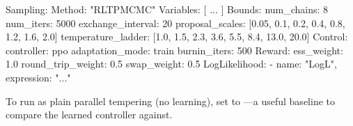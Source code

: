 \begin{yamlwin}
Sampling:
  Method: "RLTPMCMC"
  Variables: [ ... ]
  Bounds:
    num_chains: 8
    num_iters: 5000
    exchange_interval: 20
    proposal_scales: [0.05, 0.1, 0.2, 0.4, 0.8, 1.2, 1.6, 2.0]
    temperature_ladder: [1.0, 1.5, 2.3, 3.6, 5.5, 8.4, 13.0, 20.0]
  Control:
    controller: ppo
    adaptation_mode: train
    burnin_iters: 500
  Reward:
    ess_weight: 1.0
    round_trip_weight: 0.5
    swap_weight: 0.5
  LogLikelihood:
    - {name: "LogL", expression: "..."}
\end{yamlwin}

\begin{jtip}
To run  as plain parallel tempering (no learning), set
 to ---a useful baseline to compare the learned controller
against.
\end{jtip}
